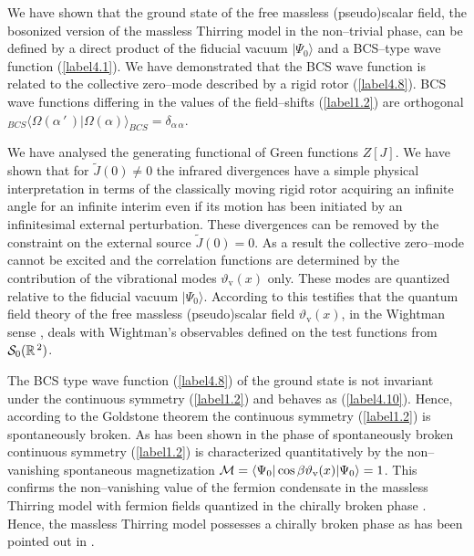 \documentclass[a4paper,12pt] {article}
\begin{document}
\hspace{0.2in} We have shown that the ground state of the free
massless (pseudo)scalar field, the bosonized version of the massless
Thirring model in the non--trivial phase, can be defined by a direct
product of the fiducial vacuum $|\Psi_0\rangle$ and a BCS--type wave
function (\ref{label4.1}). We have demonstrated that the BCS wave
function is related to the collective zero--mode described by a rigid
rotor (\ref{label4.8}). BCS wave functions differing in the values of
the field--shifts (\ref{label1.2}) are orthogonal ${_{BCS}\langle
\Omega(\alpha\,'\,)|\Omega(\alpha)\rangle_{BCS}}
=\delta_{\alpha\,\alpha}$.

We have analysed the generating functional of Green functions
$Z[J]$. We have shown that for $\tilde{J}(0)\neq 0$ the infrared
divergences have a simple physical interpretation in terms of the
classically moving rigid rotor acquiring an infinite angle for an
infinite interim even if its motion has been initiated by an
infinitesimal external perturbation. These divergences can be removed
by the constraint on the external source $\tilde{J}(0) = 0$.  As a
result the collective zero--mode cannot be excited and the correlation
functions are determined by the contribution of the vibrational modes
$\vartheta_{\mathrm v}(x)$ only. These modes are quantized relative to
the fiducial vacuum $|\Psi_0\rangle$.  According to
\cite{th0204237,th0206244} this testifies that the quantum field
theory of the free massless (pseudo)scalar field $\vartheta_{\mathrm
v}(x)$, in the Wightman sense \cite{Wi64}, deals with Wightman's
observables defined on the test functions from ${\cal
S}_0(\mathbb{R}^{\,2})$.

The BCS type wave function (\ref{label4.8}) of the ground state is not
invariant under the continuous symmetry (\ref{label1.2}) and behaves
as (\ref{label4.10}). Hence, according to the Goldstone theorem
\cite{Go61} the continuous symmetry (\ref{label1.2}) is spontaneously
broken. As has been shown in \cite{th0112184,th0204237,th0206244} the
phase of spontaneously broken continuous symmetry (\ref{label1.2}) is
characterized quantitatively by the non--vanishing spontaneous
magnetization ${\cal M} = \langle \Psi_0| \cos\beta\vartheta_{\mathrm
v}(x) |\Psi_0 \rangle = 1$. This confirms the non--vanishing value of
the fermion condensate in the massless Thirring model with fermion
fields quantized in the chirally broken phase \cite{th0105057}. Hence,
the massless Thirring model possesses a chirally broken phase as has
been pointed out in
\cite{th0105057,th0112184,th0204237,th0206244,th0210104,th0205249}.
\end{document}

